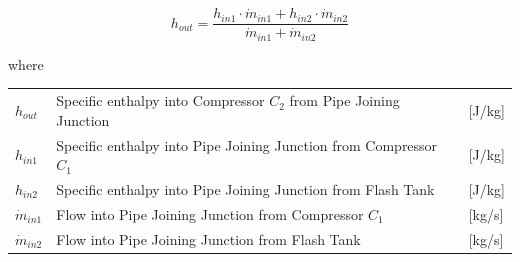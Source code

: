 \begin{equation} \label{eq:PipeJoiningJunction_Enthalpy}
	h_{out} = \frac{h_{in1} \cdot \dot{m}_{in1} + h_{in2} \cdot \dot{m}_{in2}}{ \dot{m}_{in1} + \dot{m}_{in2} }
\end{equation}

where

\begin{center}
	\begin{tabular}{l p{10cm} l}
		$h_{out}$       & Specific enthalpy into Compressor $ C_2 $ from Pipe Joining Junction & [\si{J}/\si{kg}] \\
		$h_{in1}$       & Specific enthalpy into Pipe Joining Junction from Compressor $ C_1 $ & [\si{J}/\si{kg}] \\
		$h_{in2}$       & Specific enthalpy into Pipe Joining Junction from Flash Tank         & [\si{J}/\si{kg}] \\
		$\dot{m}_{in1}$ & Flow into Pipe Joining Junction from Compressor $ C_1 $              & [\si{kg}/\si{s}] \\
		$\dot{m}_{in2}$ & Flow into Pipe Joining Junction from Flash Tank                      & [\si{kg}/\si{s}]
	\end{tabular}
\end{center}



